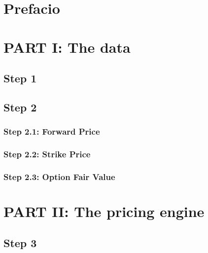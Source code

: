 \documentclass[12pt,a4paper]{article}
\renewcommand{\figurename}{Fig.}
\begin{document}


\renewcommand\contentsname{Contenidos}
\renewcommand{\figurename}{Figura}
\tableofcontents
\clearpage


\pagestyle{fancy}
\fancyhf{}
\cfoot{\thepage}
\headrule{}
\footrule{}
\renewcommand{\headrulewidth}{0.4pt}
\renewcommand{\footrulewidth}{0.4pt}


\section{Prefacio}

\section{PART I: The data}

\subsection{Step 1}

\subsection{Step 2}

\subsubsection{Step 2.1: Forward Price}

\subsubsection{Step 2.2: Strike Price}

\subsubsection{Step 2.3: Option Fair Value}

\section{PART II: The pricing engine}

\subsection{Step 3}

\end{document}
